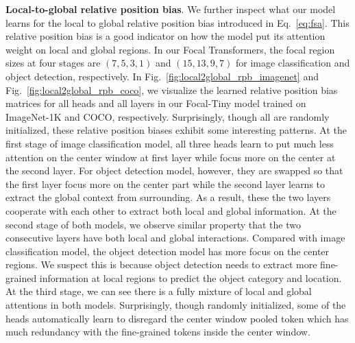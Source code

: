 \documentclass{article}
\begin{document}
\textbf{Local-to-global relative position bias}. We further inspect what our model learns for the local to global relative position bias introduced in Eq.~\eqref{eq:fsa}. This relative position bias is a good indicator on how the model put its attention weight on local and global regions. In our Focal Transformers, the focal region sizes at four stages are $(7,5,3,1)$ and $(15,13,9,7)$ for image classification and object detection, respectively. In Fig.~\ref{fig:local2global_rpb_imagenet} and Fig.~\ref{fig:local2global_rpb_coco}, we visualize the learned relative position bias matrices for all heads and all layers in our Focal-Tiny model trained on ImageNet-1K and COCO, respectively. Surprisingly, though all are randomly initialized, these relative position biases exhibit some interesting patterns. At the first stage of image classification model, all three heads learn to put much less attention on the center window at first layer while focus more on the center at the second layer. For object detection model, however, they are swapped so that the first layer focus more on the center part while the second layer learns to extract the global context from surrounding. As a result, these the two layers cooperate with each other to extract both local and global information. At the second stage of both models, we observe similar property that the two consecutive layers have both local and global interactions. Compared with image classification model, the object detection model has more focus on the center regions. We suspect this is because object detection needs to extract more fine-grained information at local regions to predict the object category and location. At the third stage, we can see there is a fully mixture of local and global attentions in both models. Surprisingly, though randomly initialized, some of the heads automatically learn to disregard the center window pooled token which has much redundancy with the fine-grained tokens inside the center window. 















%
 
\end{document}
